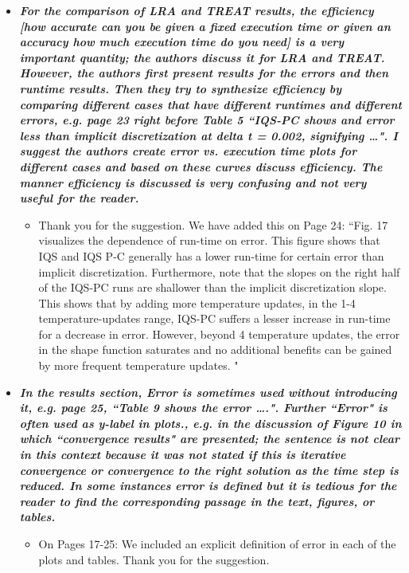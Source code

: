 \documentclass{elsarticle}
\newcommand{\iqspc}{IQS-PC\xspace}
\newcommand{\done}{\checkmark}
\newcommand{\easy}[1]{\textbf{\textit{#1}}}
\newcommand{\medm}[1]{\textbf{\textit{#1}}}
\begin{document}
\begin{itemize}
\item[\done] \medm{ For the comparison of LRA and TREAT results, the efficiency [how accurate can you be given a fixed execution time or given an accuracy how much execution time do you need] is a very important quantity; the authors discuss it for LRA and TREAT. However, the authors first present results for the errors and then runtime results. Then they try to synthesize efficiency by comparing different cases that have different runtimes and different errors, e.g. page 23 right before Table 5 ``IQS-PC shows and error less than implicit discretization at delta t = 0.002, signifying …". I suggest the authors create error vs. execution time plots for different cases and based on these curves discuss efficiency. The manner efficiency is discussed is very confusing and not very useful for the reader. }
\begin{itemize}
\item Thank you for the suggestion. We have added this on Page 24: ``Fig. 17 visualizes the dependence of run-time on error. This figure shows that IQS and IQS P-C generally has a lower run-time for certain error than implicit discretization. Furthermore, note that the slopes on the right half of the \iqspc runs are shallower than the implicit discretization slope. This shows that by adding more temperature updates, in the 1-4 temperature-updates range, \iqspc suffers a lesser increase in run-time for a decrease in error. However, beyond 4 temperature updates, the error in the shape function saturates and no additional benefits can be gained by more frequent temperature updates. "
\end{itemize}


\item[\done] \easy{ In the results section, Error is sometimes used without introducing it, e.g. page 25, ``Table 9 shows the error ….". Further ``Error" is often used as y-label in plots., e.g. in the discussion of Figure 10 in which ``convergence results" are presented; the sentence is not clear in this context because it was not stated if this is iterative convergence or convergence to the right solution as the time step is reduced. In some instances error is defined but it is tedious for the reader to find the corresponding passage in the text, figures, or tables. }
\begin{itemize}
\item On  Pages 17-25: We included an explicit definition of error in each of the plots and tables. Thank you for the suggestion.
\end{itemize}


\end{itemize}
\end{document}
